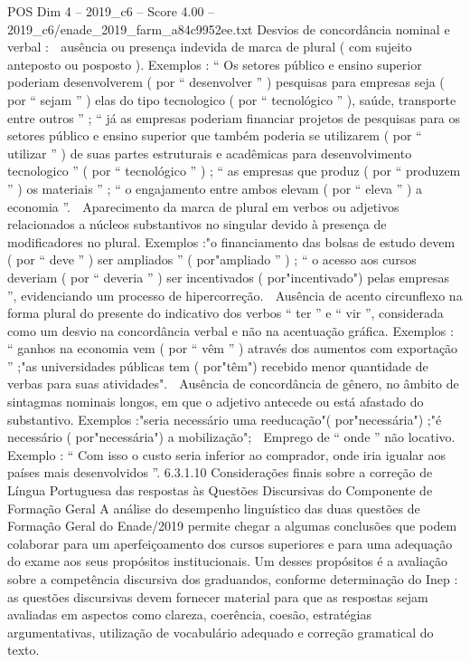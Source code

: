 \begin{textsample}{POS Dim 4 – 2019\_c6 – Score 4.00 – 2019\_c6/enade\_2019\_farm\_a84c9952ee.txt}
Desvios de concordância nominal e verbal :  ausência ou presença indevida de marca de plural ( com sujeito anteposto ou posposto ).
Exemplos : “ Os setores público e ensino superior poderiam desenvolverem ( por “ desenvolver ” ) pesquisas para empresas seja ( por “ sejam ” ) elas do tipo tecnologico ( por “ tecnológico ” ), saúde, transporte entre outros ” ; “ já as empresas poderiam financiar projetos de pesquisas para os setores público e ensino superior que também poderia se utilizarem ( por “ utilizar ” ) de suas partes estruturais e acadêmicas para desenvolvimento tecnologico ” ( por “ tecnológico ” ) ; “ as empresas que produz ( por “ produzem ” ) os materiais ” ; “ o engajamento entre ambos elevam ( por “ eleva ” ) a economia ”.  Aparecimento da marca de plural em verbos ou adjetivos relacionados a núcleos substantivos no singular devido à presença de modificadores no plural.
Exemplos :"o financiamento das bolsas de estudo devem ( por “ deve ” ) ser ampliados ” ( por"ampliado ” ) ; “ o acesso aos cursos deveriam ( por “ deveria ” ) ser incentivados ( por"incentivado") pelas empresas ”, evidenciando um processo de hipercorreção.  Ausência de acento circunflexo na forma plural do presente do indicativo dos verbos “ ter ” e “ vir ”, considerada como um desvio na concordância verbal e não na acentuação gráfica.
Exemplos : “ ganhos na economia vem ( por “ vêm ” ) através dos aumentos com exportação ” ;"as universidades públicas tem ( por"têm") recebido menor quantidade de verbas para suas atividades".  Ausência de concordância de gênero, no âmbito de sintagmas nominais longos, em que o adjetivo antecede ou está afastado do substantivo.
Exemplos :"seria necessário uma reeducação"( por"necessária") ;"é necessário ( por"necessária") a mobilização";  Emprego de “ onde ” não locativo.
Exemplo : “ Com isso o custo seria inferior ao comprador, onde iria igualar aos países mais desenvolvidos ”. 6.3.1.10 Considerações finais sobre a correção de Língua Portuguesa das respostas às Questões Discursivas do Componente de Formação Geral A análise do desempenho linguístico das duas questões de Formação Geral do Enade/2019 permite chegar a algumas conclusões que podem colaborar para um aperfeiçoamento dos cursos superiores e para uma adequação do exame aos seus propósitos institucionais.
Um desses propósitos é a avaliação sobre a competência discursiva dos graduandos, conforme determinação do Inep : as questões discursivas devem fornecer material para que as respostas sejam avaliadas em aspectos como clareza, coerência, coesão, estratégias argumentativas, utilização de vocabulário adequado e correção gramatical do texto.

\end{textsample}
